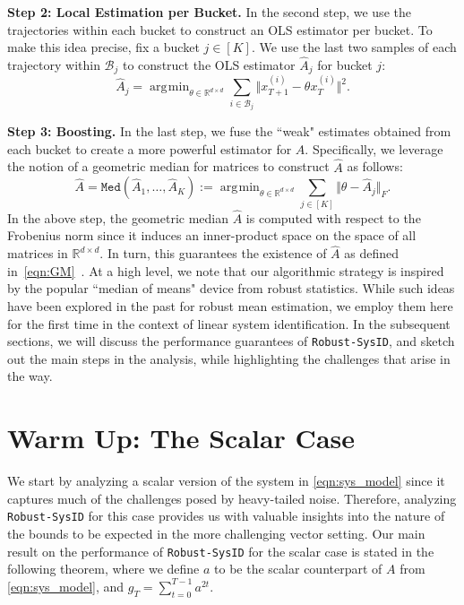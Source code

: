 \documentclass[letterpaper, 11 pt]{article}
\newcommand{\mc}{\mathcal}
\DeclareMathOperator*{\argmin}{\arg\!\min}
\begin{document}
\textbf{Step 2: Local Estimation per Bucket.} In the second step, we use the trajectories within each bucket to construct an OLS estimator per bucket. To make this idea precise, fix a bucket $j \in [K].$ We use the last two samples of each trajectory within $\mc{B}_j$ to construct the OLS estimator $\hat{A}_j$ for bucket $j$:
\begin{equation}
\hat{A}_j = \argmin_{\theta \in \mathbb{R}^{d \times d}} \sum_{i \in \mc{B}_j} \Vert x^{(i)}_{T+1} - \theta x^{(i)}_T\Vert^2.
\label{eqn:OLS}
\end{equation}

\textbf{Step 3: Boosting.} In the last step, we fuse the ``weak" estimates obtained from each bucket to create a more powerful estimator for $A$. Specifically, we leverage the notion of a geometric median for matrices to construct $\hat{A}$ as follows:
\begin{equation}
\hat{A}= \texttt{Med}(\hat{A}_1, \ldots, \hat{A}_K) := \argmin_{\theta \in \mathbb{R}^{d \times d}} \sum_{j \in [K]} \Vert \theta - \hat{A}_j \Vert_F.
\label{eqn:GM}
\end{equation}
In the above step, the geometric median $\hat{A}$ is computed with respect to the Frobenius norm since it induces an inner-product space on the space of all matrices in $\mathbb{R}^{d \times d}.$ In turn, this guarantees the existence of $\hat{A}$ as defined in~\eqref{eqn:GM}~\cite{minsker2015geometric}. At a high level, we note that our algorithmic strategy is inspired by the popular ``median of means" device from robust statistics. While such ideas have been explored in the past for robust mean estimation, we employ them here for the first time in the context of linear system identification. In the subsequent sections, we will discuss the performance guarantees of \texttt{Robust-SysID}, and sketch out the main steps in the analysis, while highlighting the challenges that arise in the way. 

\section{Warm Up: The Scalar Case}
\label{sec:scalar}
We start by analyzing a scalar version of the system in  \eqref{eqn:sys_model} since it captures much of the challenges posed by heavy-tailed noise. Therefore, analyzing \texttt{Robust-SysID} for this case provides us with valuable insights into the nature of the bounds to be expected in the more challenging vector setting. Our main result on the performance of \texttt{Robust-SysID} for the scalar case is stated in the following theorem,  where we define $a$ to be the scalar counterpart of $A$ from \eqref{eqn:sys_model}, and $g_T = \sum_{t=0}^{T-1} a^{2t}$.
\end{document}
